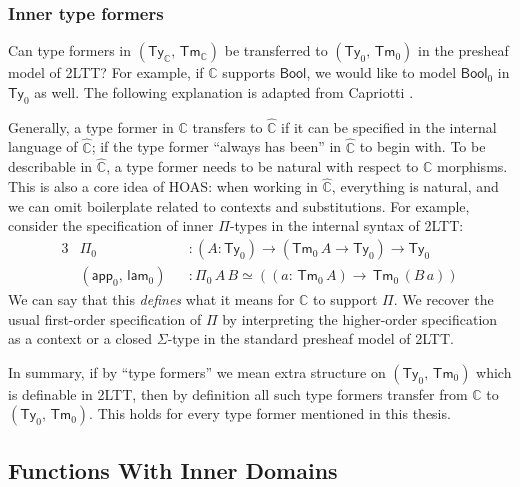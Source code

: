 \documentclass[12pt,a4paper,twoside,openany]{book}
\theoremstyle{remark}
\theoremstyle{definition}
\theoremstyle{theorem}
\newcommand{\ms}[1]{\mathsf{#1}}
\newcommand{\mbb}[1]{\mathbb{#1}}
\newcommand{\Tm}{\mathsf{Tm}}
\newcommand{\Ty}{\mathsf{Ty}}
\newcommand{\app}{\ms{app}}
\newcommand{\Bool}{\ms{Bool}}
\newcommand{\mbbC}{\mbb{C}}
\newcommand{\hmbbC}{\hat{\mbb{C}}}
\newcommand{\lam}{\ms{lam}}
\begin{document}
\subsubsection{Inner type formers}

Can type formers in $(\Ty_{\mbbC},\,\Tm_{\mbbC})$ be transferred to
$(\Ty_0,\,\Tm_0)$ in the presheaf model of 2LTT? For example, if $\mbbC$
supports $\Bool$, we would like to model $\Bool_0$ in $\Ty_0$ as well. The
following explanation is adapted from Capriotti \cite[Section
  2.3]{capriotti2017models}.

Generally, a type former in $\mbbC$ transfers to $\hmbbC$ if it can be specified
in the internal language of $\hmbbC$; if the type former ``always has been'' in
$\hmbbC$ to begin with. To be describable in $\hmbbC$, a type former needs to be
natural with respect to $\mbbC$ morphisms. This is also a core idea of HOAS:
when working in $\hmbbC$, everything is natural, and we can omit boilerplate
related to contexts and substitutions. For example, consider the specification
of inner $\Pi$-types in the internal syntax of 2LTT:
\begin{alignat*}{3}
  &\Pi_0             &&: (A : \Ty_0) \to (\Tm_0\,A \to \Ty_0) \to \Ty_0\\
  &(\app_0,\,\lam_0) &&: \Pi_0\,A\,B \simeq ((a :\,\Tm_0\,A) \to \,\Tm_0\,(B\,a))
\end{alignat*}
We can say that this \emph{defines} what it means for $\mbbC$ to support
$\Pi$. We recover the usual first-order specification of $\Pi$ by interpreting
the higher-order specification as a context or a closed $\Sigma$-type in the
standard presheaf model of 2LTT.

In summary, if by ``type formers'' we mean extra structure on $(\Ty_0,\,\Tm_0)$
which is definable in 2LTT, then by definition all such type formers
transfer from $\mbbC$ to $(\Ty_0,\,\Tm_0)$. This holds for every type former
mentioned in this thesis.

\subsection{Functions With Inner Domains}
\label{sec:functions-with-inner-domains}
\end{document}

